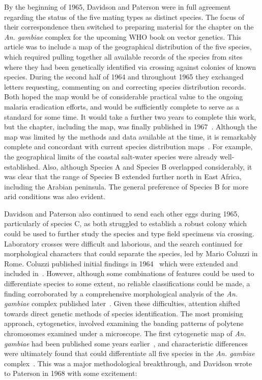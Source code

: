 \documentclass[a4paper,11pt,abstracton,hidelinks]{scrartcl}
\begin{document}
By the beginning of 1965, Davidson and Paterson were in full agreement regarding the status of the five mating types as distinct species.
%
The focus of their correspondence then switched to preparing material for the chapter on the \textit{An. gambiae} complex for the upcoming WHO book on vector genetics.
%
This article was to include a map of the geographical distribution of the five species, which required pulling together all available records of the species from sites where they had been genetically identified via crossing against colonies of known species.
%
During the second half of 1964 and throughout 1965 they exchanged letters requesting, commenting on and correcting species distribution records.
%
Both hoped the map would be of considerable practical value to the ongoing malaria eradication efforts, and would be sufficiently complete to serve as a standard for some time.
%
It would take a further two years to complete this work, but the chapter, including the map, was finally published in 1967~\parencite{Davidson1967}.
%
Although the map was limited by the methods and data available at the time, it is remarkably complete and concordant with current species distribution maps~\parencite{Wiebe2017}.
%
For example, the geographical limits of the coastal salt-water species were already well-established.
%
Also, although Species A and Species B overlapped considerably, it was clear that the range of Species B extended further north in East Africa, including the Arabian peninsula.
%
The general preference of Species B for more arid conditions was also evident.


Davidson and Paterson also continued to send each other eggs during 1965, particularly of species C, as both struggled to establish a robust colony which could be used to further study the species and type field specimens via crossing.
%
Laboratory crosses were difficult and laborious, and the search continued for morphological characters that could separate the species, led by Mario Coluzzi in Rome.
%
Coluzzi published initial findings in 1964~\parencite{Coluzzi1964} which were extended and included in~\textcite{Davidson1967}.
%
However, although some combinations of features could be used to differentiate species to some extent, no reliable classifications could be made, a finding corroborated by a comprehensive morphological analysis of the \textit{An. gambiae} complex published later~\parencite{Coetzee1989}.
%
Given these difficulties, attention shifted towards direct genetic methods of species identification.
%
The most promising approach, cytogenetics, involved examining the banding patterns of polytene chromosomes examined under a microscope.
%
The first cytogenetic map of \textit{An. gambiae} had been published some years earlier~\parencite{Frizzi1956}, and characteristic differences were ultimately found that could differentiate all five species in the \textit{An. gambiae} complex~\parencite{Coluzzi1967,Coluzzi1968,Coluzzi1969}.
%
This was a major methodological breakthrough, and Davidson wrote to Paterson in 1968 with some excitement:
\end{document}

